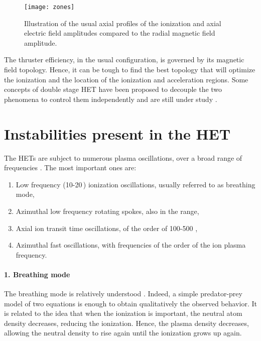   \begin{figure}[hbt]
    \centering
    \texttt{[image: zones]}
    \caption{Illustration of the usual axial profiles of the ionization and axial electric field amplitudes compared to the radial magnetic field amplitude.}
    \label{fig-zones}
  \end{figure}

  The thruster efficiency, in the usual configuration, is governed by its magnetic field topology.
  Hence, it can be tough to find the best topology that will optimize the ionization and the location of the ionization and acceleration regions.
  Some concepts of double stage \ac{HET} have been proposed to decouple the two phenomena to control them independently and are still under study \citep{dubois2018}.
  

  
  \section{Instabilities present in the \acs{HET} }
  \label{sec-physics}

  The \ac{HET}s are subject to numerous plasma oscillations, over a broad range of frequencies \citep{boeuf2017,choueiri2001}.
  The most important ones are\string:
  \begin{enumerate}
    \item Low frequency (10-20\,\kilo\hertz) ionization oscillations, usually referred to as breathing mode,
    \item Azimuthal low frequency rotating spokes, also in the \kilo\hertz{} range,
    \item Axial ion transit time oscillations, of the order of 100-500 \kilo\hertz,
    \item Azimuthal fast oscillations, with frequencies of the order of the ion plasma frequency.
  \end{enumerate} 

  \paragraph{1. Breathing mode\\}
  The breathing mode is relatively understood \citep{boeuf1998,barral2009,hara2014}.
  Indeed, a simple predator-prey model of two equations is enough to obtain qualitatively the observed behavior.
  It is related to the idea that when the ionization is important, the neutral atom density decreases, reducing the ionization.
  Hence, the plasma density decreases, allowing the neutral density to rise again until the ionization grows up again.
  

